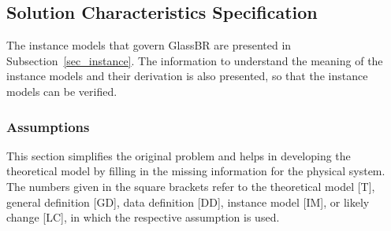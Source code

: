 \documentclass[12pt]{article}
\newcommand{\progname}{GlassBR}
\begin{document}
\subsection{Solution Characteristics Specification}

The instance models that govern \progname{} are presented in Subsection~\ref{sec_instance}. The information
to understand the meaning of the instance models and their derivation is also presented, so
that the instance models can be verified.

\subsubsection{Assumptions} \label{Assumptions}

This section simplifies the original problem and helps in developing the
theoretical model by filling in the missing information for the physical
system. The numbers given in the square brackets refer to the theoretical model
[T], general definition [GD], data definition [DD], instance model [IM], or
likely change [LC], in which the respective assumption is used.
\end{document}
